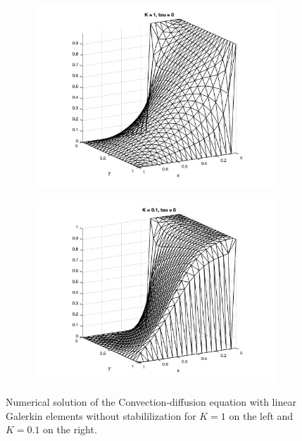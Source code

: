 \documentclass[hidelinks]{article}
\begin{document}
\begin{figure}[H]\centering
    
    \begin{subfigure}[t]{0.45\textwidth}
        \centering
        \includegraphics[width=\textwidth]{pic/k1t0.jpg}
    \end{subfigure}
    \hfill
    \begin{subfigure}[t]{0.45\textwidth}
        \centering
        \includegraphics[width=\textwidth]{pic/k01t0.jpg}
    \end{subfigure}
    \caption{Numerical solution of the Convection-diffusion equation with linear Galerkin elements without stabililization for $K=1$ on the left and $K=0.1$ on the right.}\label{fig:nostab1}

\end{figure}
\end{document}
